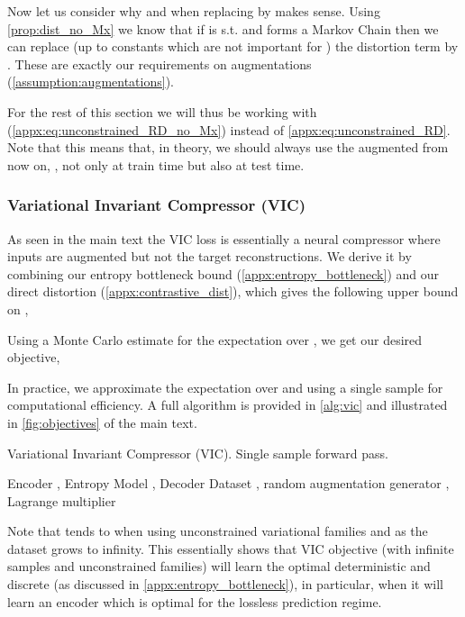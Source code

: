 \documentclass[final]{article}
\begin{document}
Now let us consider why and when replacing  by  makes sense.
Using \cref{prop:dist_no_Mx} we know that if  is s.t.  and  forms a Markov Chain then we can replace (up to constants which are not important for ) the distortion term
 by . 
These are exactly our requirements on augmentations (\cref{assumption:augmentations}).

For the rest of this section we will thus be working with  (\cref{appx:eq:unconstrained_RD_no_Mx}) instead of \cref{appx:eq:unconstrained_RD}.
Note that this means that, in theory, we should always use the augmented  from now on, \ie, not only at train time but also at test time.


\subsubsection{Variational Invariant Compressor (VIC)}
\label{appx:vic}

As seen in the main text the VIC loss is essentially a neural compressor where inputs are augmented but not the target reconstructions.
We derive it by combining our entropy bottleneck bound (\cref{appx:entropy_bottleneck}) and our direct distortion (\cref{appx:contrastive_dist}), which gives the following upper bound on ,



Using a Monte Carlo estimate for the expectation over , we get our desired objective,

In practice, we approximate the expectation over  and  using a single sample for computational efficiency.
A full algorithm is provided in \cref{alg:vic} and illustrated in \cref{fig:objectives} of the main text.

\begin{algorithm}[H]
\caption{Variational Invariant Compressor (VIC). Single sample forward pass.}
\label{alg:vic}
    \begin{algorithmic}[1]
    \Require Encoder ,  Entropy Model ,  Decoder 
    \Require Dataset , random augmentation generator , Lagrange multiplier 
    \State   {}
    \State  {}
    \State  {}
    \State  {}
    \State  {} \\
    \Return 
\end{algorithmic}
\end{algorithm} 
Note that  tends to  when using unconstrained variational families and as the dataset grows to infinity.
This essentially shows that VIC objective (with infinite samples and unconstrained families) will learn the optimal deterministic and discrete  (as discussed in \cref{appx:entropy_bottleneck}), in particular, when  it will learn an encoder which is optimal for the lossless prediction regime.
\end{document}
